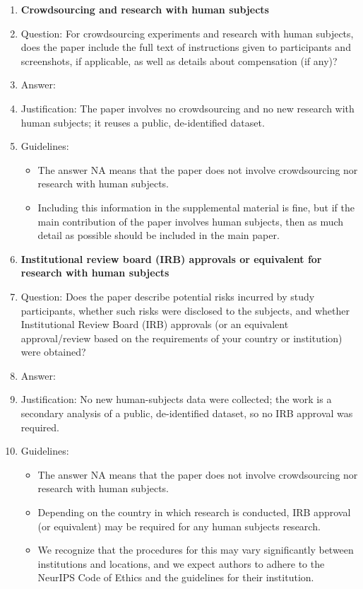 \begin{enumerate}
\item {\bf Crowdsourcing and research with human subjects}
    \item[] Question: For crowdsourcing experiments and research with human subjects, does the paper include the full text of instructions given to participants and screenshots, if applicable, as well as details about compensation (if any)?
    \item[] Answer: \answerNA{}
    \item[] Justification: The paper involves no crowdsourcing and no new research with human subjects; it reuses a public, de-identified dataset.
    \item[] Guidelines:
    \begin{itemize}
        \item The answer NA means that the paper does not involve crowdsourcing nor research with human subjects.
        \item Including this information in the supplemental material is fine, but if the main contribution of the paper involves human subjects, then as much detail as possible should be included in the main paper.
    \end{itemize}

\item {\bf Institutional review board (IRB) approvals or equivalent for research with human subjects}
    \item[] Question: Does the paper describe potential risks incurred by study participants, whether such risks were disclosed to the subjects, and whether Institutional Review Board (IRB) approvals (or an equivalent approval/review based on the requirements of your country or institution) were obtained?
    \item[] Answer: \answerNA{}
    \item[] Justification: No new human-subjects data were collected; the work is a secondary analysis of a public, de-identified dataset, so no IRB approval was required.
    \item[] Guidelines:
    \begin{itemize}
        \item The answer NA means that the paper does not involve crowdsourcing nor research with human subjects.
        \item Depending on the country in which research is conducted, IRB approval (or equivalent) may be required for any human subjects research.
        \item We recognize that the procedures for this may vary significantly between institutions and locations, and we expect authors to adhere to the NeurIPS Code of Ethics and the guidelines for their institution.
    \end{itemize}


\end{enumerate}
